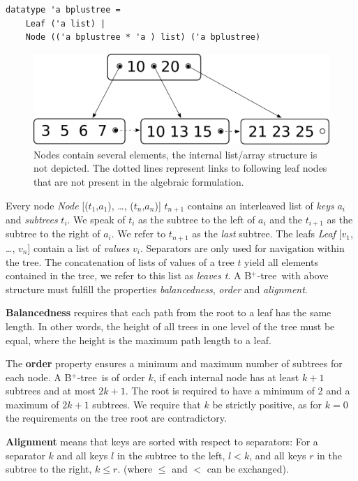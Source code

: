 \documentclass[a4paper,UKenglish,cleveref, autoref, thm-restate]{lipics-v2021}
\newcommand{\btree}{B$^+$-tree}
\begin{document}
\begin{lstlisting}[mathescape=true, language=Isabelle,label=lst:btree-def]
datatype 'a bplustree =
    Leaf ('a list) |
    Node (('a bplustree * 'a ) list) ('a bplustree)
\end{lstlisting}


\begin{figure}
    \centering
    \includegraphics[width=0.5\linewidth]{btree-basic-nopair.pdf}
    \caption[Visualization of a \btree]
    {Nodes contain several elements, the internal list/array structure is not depicted.
    The dotted lines represent links to following leaf nodes that are not present in the algebraic formulation.}
    \label{fig:btree-basic}
\end{figure}


Every node \emph{Node} [($t_1$,$a_1$), …, ($t_n$,$a_n$)] $t_{n+1}$ contains an interleaved list of \textit{keys} $a_i$ and \textit{subtrees} $t_i$.
We speak of $t_i$ as the subtree to the left of $a_i$ and
the $t_{i+1}$ as the subtree to the right of $a_i$.
We refer to $t_{n+1}$ as the \textit{last} subtree.
The leafs \emph{Leaf} [$v_1$, …, $v_n$] contain a list of \textit{values} $v_i$.
Separators are only used for navigation within the tree.
The concatenation of lists of values of a tree $t$ yield
all elements contained in the tree, we refer to this list as \emph{leaves t}.
A \btree\ with above structure must fulfill the properties
\textit{balancedness}, \textit{order} and \textit{alignment}.

\textbf{Balancedness} requires
that each path from the root to a leaf has the same length.
In other words, the height of all trees in one level of the tree must be equal,
where the height is the maximum path length to a leaf.

The \textbf{order} property ensures a minimum and maximum
number of subtrees for each node.
A \btree\ is of order $k$, if each internal node has at least $k+1$
subtrees and at most $2k+1$.
The root is required to have a minimum of 2 and a maximum of $2k+1$ subtrees.
We require that $k$ be strictly positive, as for $k = 0$ the requirements on the tree
root are contradictory.

\textbf{Alignment} means that keys are sorted with respect to separators:
For a separator $k$ and all keys $l$ in the subtree to the left, $l < k$,
and all keys $r$ in the subtree to the right, $k \leq r$.
(where $\leq$ and $<$ can be exchanged).
\end{document}
